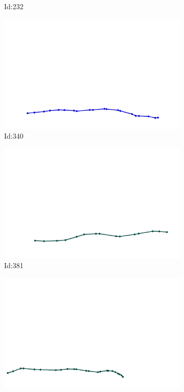 \documentclass[12pt,twoside]{report}
\begin{document}
\begin{figure}
\begin{subfigure}[b]{0.20\textwidth}
\caption{Id:232}
\end{subfigure}
\begin{subfigure}[b]{0.20\textwidth}
\centering
\includegraphics[width=\textwidth]{../../trajectories/340.png}
\caption{Id:340}
\end{subfigure}
\begin{subfigure}[b]{0.20\textwidth}
\centering
\includegraphics[width=\textwidth]{../../trajectories/381.png}
\caption{Id:381}
\end{subfigure}
\begin{subfigure}[b]{0.20\textwidth}
\centering
\includegraphics[width=\textwidth]{../../trajectories/388.png}

\end{subfigure}
\end{figure}
\end{document}
